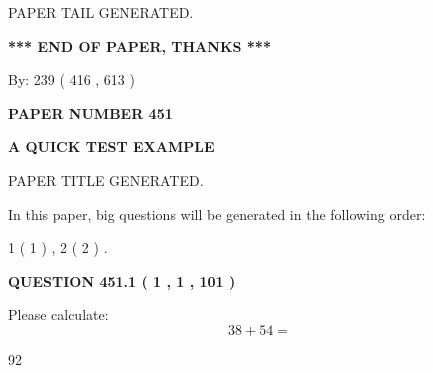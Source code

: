 \documentclass[12pt]{article}
\begin{document}
\vspace{2.0in} PAPER TAIL GENERATED.
   
   
   
   
\vspace{1.0in} 
{\textbf{\large{ *** END OF PAPER, THANKS *** }}} 
   
   
\hspace{1.0in} By: 
 239 ( 416 ,  613 )
   
   
   
   
\newpage 
\setcounter{page}{ 
   451001 } 
   
   
   
   
 {\textbf{ \Large{ PAPER NUMBER  451  }}}
   
   
\vspace{0.2in}
   
   
   
   
   
   
   
   
 \vspace{0.2in}
{\LARGE {\textbf{ A QUICK TEST EXAMPLE}}}
   
   
 PAPER TITLE GENERATED.
   
   
   
\vspace{0.2in}
   
In this paper, big questions will be generated in the following order: 
   
   
   1 ( 1 )
 ,
   2 ( 2 )
 .
  
\vspace{0.2in}
  
{\textbf{\Large{QUESTION
451.1 
 ( 1 , 1 , 101 )
}}}
  
  
 
Please calculate:
\begin{equation}
38 +  %
54 = \nonumber
\end{equation}
 
 
 
\noindent{}
 
 

92
 
 
\noindent{}
 
 

 
 
\end{document}
